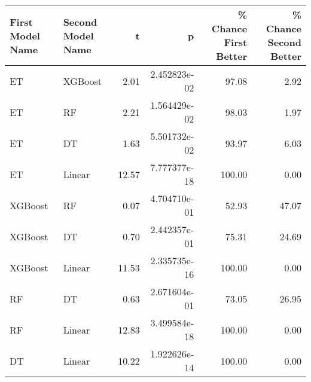 \begin{tabular}{llrrrr}
\toprule
First Model Name & Second Model Name &     t &            p &  \% Chance First Better &  \% Chance Second Better \\
\midrule
              ET &           XGBoost &  2.01 & 2.452823e-02 &                  97.08 &                    2.92 \\
              ET &                RF &  2.21 & 1.564429e-02 &                  98.03 &                    1.97 \\
              ET &                DT &  1.63 & 5.501732e-02 &                  93.97 &                    6.03 \\
              ET &            Linear & 12.57 & 7.777377e-18 &                 100.00 &                    0.00 \\
         XGBoost &                RF &  0.07 & 4.704710e-01 &                  52.93 &                   47.07 \\
         XGBoost &                DT &  0.70 & 2.442357e-01 &                  75.31 &                   24.69 \\
         XGBoost &            Linear & 11.53 & 2.335735e-16 &                 100.00 &                    0.00 \\
              RF &                DT &  0.63 & 2.671604e-01 &                  73.05 &                   26.95 \\
              RF &            Linear & 12.83 & 3.499584e-18 &                 100.00 &                    0.00 \\
              DT &            Linear & 10.22 & 1.922626e-14 &                 100.00 &                    0.00 \\
\bottomrule
\end{tabular}
